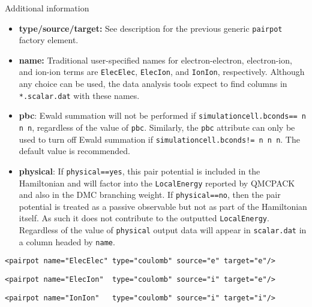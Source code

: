 Additional information
\begin{itemize}
  \item{\textbf{type/source/target:} See description for the previous generic \texttt{pairpot} factory element.}
  \item{\textbf{name:} Traditional user-specified names for electron-electron, electron-ion, and ion-ion terms are \texttt{ElecElec}, \texttt{ElecIon}, and \texttt{IonIon}, respectively.  Although any choice can be used, the data analysis tools expect to find columns in \texttt{*.scalar.dat} with these names.}
  \item{\textbf{pbc}: Ewald summation will not be performed if \texttt{simulationcell.bconds== n n n}, regardless of the value of \texttt{pbc}.  Similarly, the \texttt{pbc} attribute can only be used to turn off Ewald summation if \texttt{simulationcell.bconds!= n n n}.  The default value is recommended.}
  \item{\textbf{physical}: If \texttt{physical==yes}, this pair potential is included in the Hamiltonian and will factor into the \texttt{LocalEnergy} reported by QMCPACK and also in the DMC branching weight.  If \texttt{physical==no}, then the pair potential is treated as a passive observable but not as part of the Hamiltonian itself.  As such it does not contribute to the outputted \texttt{LocalEnergy}.  Regardless of the value of \texttt{physical} output data will appear in \texttt{scalar.dat} in a column headed by \texttt{name}.}
\end{itemize}


\begin{lstlisting}[style=QMCPXML,caption=QMCPXML element for Coulomb interaction between electrons.]
  <pairpot name="ElecElec" type="coulomb" source="e" target="e"/>
\end{lstlisting}

\begin{lstlisting}[style=QMCPXML,caption=QMCPXML element for Coulomb interaction between electrons and ions (all-electron only).]
  <pairpot name="ElecIon"  type="coulomb" source="i" target="e"/>
\end{lstlisting}

\begin{lstlisting}[style=QMCPXML,caption=QMCPXML element for Coulomb interaction between ions.]
  <pairpot name="IonIon"   type="coulomb" source="i" target="i"/>
\end{lstlisting}



